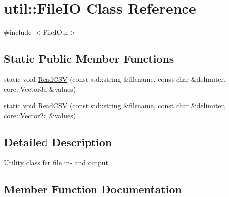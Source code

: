 \hypertarget{classutil_1_1FileIO}{}\section{util\+:\+:File\+IO Class Reference}
\label{classutil_1_1FileIO}


{\ttfamily \#include $<$File\+I\+O.\+h$>$}

\subsection*{Static Public Member Functions}
\begin{DoxyCompactItemize}
\item 
static void \hyperlink{classutil_1_1FileIO_aa92b94ba7a5e0fea0e8c2f801c8d14b8}{Read\+C\+SV} (const std\+::string \&filename, const char \&delimiter, core\+::\+Vector3d \&values)
\item 
static void \hyperlink{classutil_1_1FileIO_ab33278a4ae57c8c5a56b6d80cbc27184}{Read\+C\+SV} (const std\+::string \&filename, const char \&delimiter, core\+::\+Vector2d \&values)
\end{DoxyCompactItemize}


\subsection{Detailed Description}
Utility class for file in-\/ and output. 

\subsection{Member Function Documentation}
